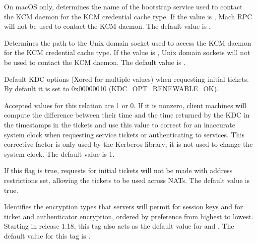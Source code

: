 \documentclass[letterpaper,10pt,english]{sphinxmanual}
\begin{document}
\begin{description}
\sphinxAtStartPar
On macOS only, determines the name of the bootstrap service used to
contact the KCM daemon for the KCM credential cache type.  If the
value is \sphinxcode{\sphinxupquote{\sphinxhyphen{}}}, Mach RPC will not be used to contact the KCM
daemon.  The default value is .

\sphinxAtStartPar
Determines the path to the Unix domain socket used to access the
KCM daemon for the KCM credential cache type.  If the value is
\sphinxcode{\sphinxupquote{\sphinxhyphen{}}}, Unix domain sockets will not be used to contact the KCM
daemon.  The default value is
.

\sphinxAtStartPar
Default KDC options (Xored for multiple values) when requesting
initial tickets.  By default it is set to 0x00000010
(KDC\_OPT\_RENEWABLE\_OK).

\sphinxAtStartPar
Accepted values for this relation are 1 or 0.  If it is nonzero,
client machines will compute the difference between their time and
the time returned by the KDC in the timestamps in the tickets and
use this value to correct for an inaccurate system clock when
requesting service tickets or authenticating to services.  This
corrective factor is only used by the Kerberos library; it is not
used to change the system clock.  The default value is 1.

\sphinxAtStartPar
If this flag is true, requests for initial tickets will not be
made with address restrictions set, allowing the tickets to be
used across NATs.  The default value is true.

\sphinxAtStartPar
Identifies the encryption types that servers will permit for
session keys and for ticket and authenticator encryption, ordered
by preference from highest to lowest.  Starting in release 1.18,
this tag also acts as the default value for
 and .  The
default value for this tag is .


\end{description}
\end{document}
